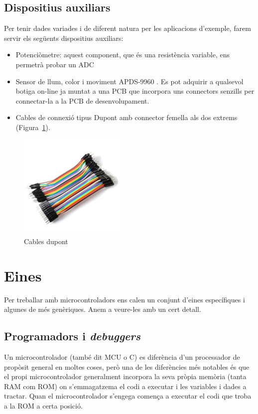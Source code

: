 \subsection{Dispositius auxiliars}
Per tenir dades variades i de diferent natura per les aplicacions d'exemple, farem servir els següents dispositius auxiliars:
\begin{itemize}
 \item Potenciòmetre: aquest component, que és una resistència variable, ens permetrà probar un \gls{ADC}
 \item Sensor de llum, color i moviment APDS-9960 \cite{apds9960}. Es pot adquirir a qualsevol botiga on-line ja muntat a una \gls{PCB} que incorpora uns connectors senzills per connectar-la a la PCB de desenvolupament.
 \item Cables de connexió tipus Dupont amb connector femella als dos extrems (Figura~\ref{fig:dupont}).
\end{itemize}

\begin{figure}
 \centering
 \includegraphics[width=0.45\textwidth, keepaspectratio]{imatges/cables_dupont.jpg}
 \caption{Cables dupont}
 \label{fig:dupont}
\end{figure}

\section{Eines}

Per treballar amb microcontroladors ens calen un conjunt d'eines específiques i algunes de més genèriques. Anem a veure-les amb un cert detall.

\subsection{Programadors i {\em debuggers}}
Un microcontrolador (també dit \gls{MCU} o \textmu C) es diferència d'un processador de propòsit general en moltes coses, però una de les diferències més notables és que el propi microcontrolador generalment incorpora la seva pròpia memòria (tanta \gls{RAM} com \gls{ROM}) on s'emmagatzema el codi a executar i les variables i dades a tractar. Quan el microcontrolador s'engega comença a executar el codi que troba a la ROM a certa posició.

